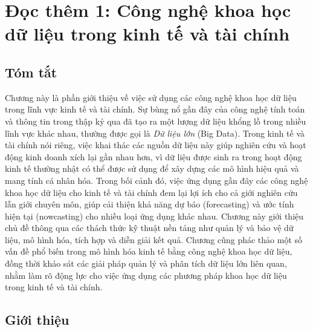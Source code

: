 \chapter{Đọc thêm 1: Công nghệ khoa học dữ liệu trong kinh tế và tài chính}
\label{ch:M1L1-reading1}


\section*{Tóm tắt}

Chương này là phần giới thiệu về việc sử dụng các công nghệ khoa học dữ liệu trong lĩnh vực kinh tế và tài chính. Sự bùng nổ gần đây của công nghệ tính toán và thông tin trong thập kỷ qua đã tạo ra một lượng dữ liệu khổng lồ trong nhiều lĩnh vực khác nhau, thường được gọi là \emph{Dữ liệu lớn} (Big Data). Trong kinh tế và tài chính nói riêng, việc khai thác các nguồn dữ liệu này giúp nghiên cứu và hoạt động kinh doanh xích lại gần nhau hơn, vì dữ liệu được sinh ra trong hoạt động kinh tế thường nhật có thể được sử dụng để xây dựng các mô hình hiệu quả và mang tính cá nhân hóa. Trong bối cảnh đó, việc ứng dụng gần đây các công nghệ khoa học dữ liệu cho kinh tế và tài chính đem lại lợi ích cho cả giới nghiên cứu lẫn giới chuyên môn, giúp cải thiện khả năng dự báo (forecasting) và ước tính hiện tại (nowcasting) cho nhiều loại ứng dụng khác nhau. Chương này giới thiệu chủ đề thông qua các thách thức kỹ thuật nền tảng như quản lý và bảo vệ dữ liệu, mô hình hóa, tích hợp và diễn giải kết quả. Chương cũng phác thảo một số vấn đề phổ biến trong mô hình hóa kinh tế bằng công nghệ khoa học dữ liệu, đồng thời khảo sát các giải pháp quản lý và phân tích dữ liệu lớn liên quan, nhằm làm rõ động lực cho việc ứng dụng các phương pháp khoa học dữ liệu trong kinh tế và tài chính.

\section{Giới thiệu}

